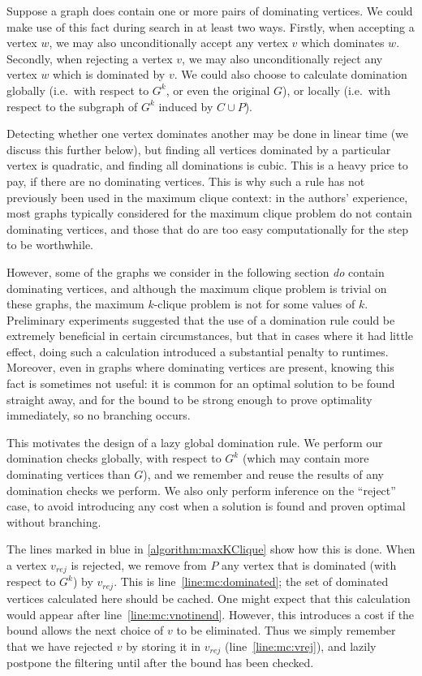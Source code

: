 \documentclass[letterpaper]{article}
\newcommand{\mcline}[1]{line~\ref{line:mc:#1}}
\newcommand{\vrej}{v_{\mathit{rej}}}
\begin{document}
Suppose a graph does contain one or more pairs of dominating vertices. We could make use of this
fact during search in at least two ways. Firstly, when accepting a vertex $w$, we may also
unconditionally accept any vertex $v$ which dominates $w$. Secondly, when rejecting a vertex $v$, we
may also unconditionally reject any vertex $w$ which is dominated by $v$.  We could also choose to
calculate domination globally (i.e.\ with respect to $G^k$, or even the original $G$), or locally
(i.e.\ with respect to the subgraph of $G^k$ induced by $C \cup P$).

Detecting whether one vertex dominates another may be done in linear time (we discuss this further
below), but finding all vertices dominated by a particular vertex is quadratic, and finding all
dominations is cubic. This is a heavy price to pay, if there are no dominating vertices.  This is
why such a rule has not previously been used in the maximum clique context: in the authors'
experience, most graphs typically considered for the maximum clique problem do not contain
dominating vertices, and those that do are too easy computationally for the step to be worthwhile.

However, some of the graphs we consider in the following section \emph{do} contain dominating
vertices, and although the maximum clique problem is trivial on these graphs, the maximum $k$-clique
problem is not for some values of $k$. Preliminary experiments suggested that the use of a
domination rule could be extremely beneficial in certain circumstances, but that in cases where it
had little effect, doing such a calculation introduced a substantial penalty to runtimes. Moreover,
even in graphs where dominating vertices are present, knowing this fact is sometimes not useful: it
is common for an optimal solution to be found straight away, and for the bound to be strong enough
to prove optimality immediately, so no branching occurs.

This motivates the design of a lazy global domination rule. We perform our domination checks
globally, with respect to $G^k$ (which may contain more dominating vertices than $G$), and we
remember and reuse the results of any domination checks we perform. We also only perform inference
on the ``reject'' case, to avoid introducing any cost when a solution is found and proven optimal
without branching.

The lines marked in blue in \cref{algorithm:maxKClique} show how this is done. When a vertex $\vrej$
is rejected, we remove from $P$ any vertex that is dominated (with respect to $G^k$) by $\vrej$.
This is \mcline{dominated}; the set of dominated vertices calculated here should be cached.  One
might expect that this calculation would appear after \mcline{vnotinend}. However, this introduces a
cost if the bound allows the next choice of $v$ to be eliminated. Thus we simply remember that we
have rejected $v$ by storing it in $\vrej$ (\mcline{vrej}), and lazily postpone the filtering until
after the bound has been checked.
\end{document}
